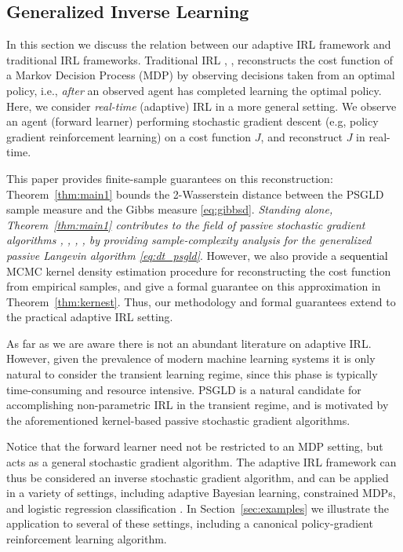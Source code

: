 \documentclass[journal,onecolumn]{IEEEtran}
\newcommand{\rew}{J}
\begin{document}
\subsection{Generalized Inverse Learning} 
In this section we discuss the relation between our adaptive IRL framework and traditional IRL frameworks. 
Traditional IRL \cite{ng2000algorithms}, \cite{HRA16}, \cite{BGN19} reconstructs the cost function of a Markov Decision Process (MDP) by observing decisions taken from an optimal policy, i.e., \textit{after} an observed agent has completed learning the optimal policy. Here, we consider \textit{real-time} (adaptive) IRL in a more general setting. We observe an agent (forward learner) performing stochastic gradient descent (e.g, policy gradient reinforcement learning) on a cost function $\rew$, and reconstruct $\rew$ in real-time. {\color{black} This paper provides finite-sample guarantees on this reconstruction: Theorem~\ref{thm:main1} bounds the 2-Wasserstein distance between the PSGLD sample measure and the Gibbs measure \eqref{eq:gibbsd}. \textit{Standing alone, Theorem~\ref{thm:main1} contributes to the field of passive stochastic gradient algorithms \cite{YY96}, \cite{nazin1989passive}, \cite{revesz1977apply}, \cite{hardle1987nonparametric}, by providing sample-complexity analysis for the generalized passive Langevin algorithm \eqref{eq:dt_psgld}}. However, we also provide a \textcolor{black}{sequential} MCMC kernel density estimation procedure for reconstructing the cost function from empirical samples, and give a formal guarantee on this approximation in Theorem~\ref{thm:kernest}. Thus, our methodology and formal guarantees extend to the practical adaptive IRL setting.

As far as we are aware there is not an abundant literature on adaptive IRL. However, given the prevalence of modern machine learning systems it is only natural to consider the transient learning regime, since this phase is typically time-consuming and resource intensive. PSGLD is a natural candidate for accomplishing non-parametric IRL in the transient regime, and is motivated by the aforementioned kernel-based passive stochastic gradient algorithms.} 

Notice that the forward learner need not be restricted to an MDP setting, but acts as a general stochastic gradient algorithm. The adaptive IRL framework can thus be considered an inverse stochastic gradient algorithm, and can be applied in a variety of settings, including adaptive Bayesian learning, constrained MDPs, and logistic regression classification \cite{krishnamurthy2021langevin}. In Section~\ref{sec:examples} we illustrate the application to several of these settings, including a canonical policy-gradient reinforcement learning algorithm.
\end{document}
